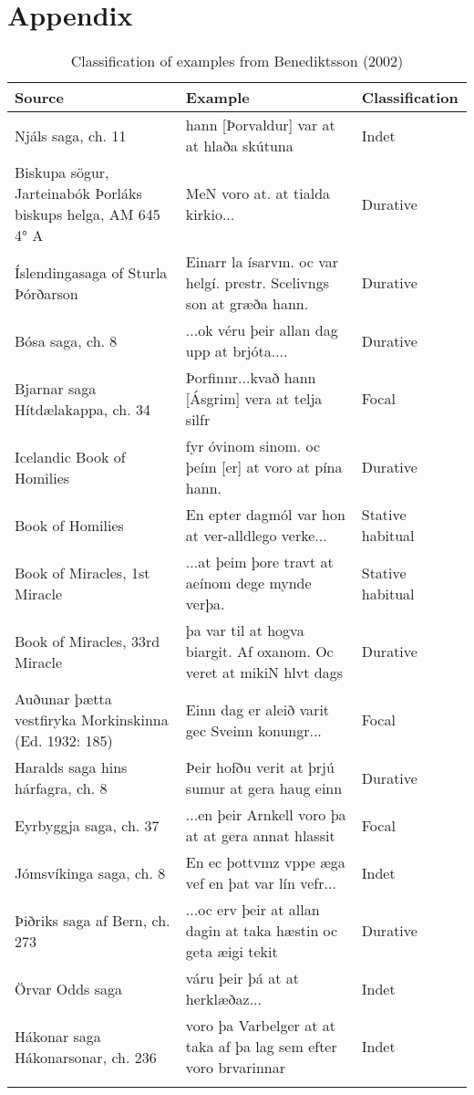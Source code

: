 \documentclass[output=paper,colorlinks,citecolor=brown]{langscibook}
\begin{document}
\sloppy\printbibliography[heading=subbibliography,notkeyword=this]

\newpage
\section*{Appendix}
\begin{paperappendix}

\begin{table}
\small
\caption{Classification of examples from Benediktsson (2002) }
\begin{tabularx}{\textwidth}{>{\raggedright\arraybackslash}p{3cm} >{\raggedright\arraybackslash}p{6cm} l}
\lsptoprule
Source & Example & Classification \\
\midrule
Njáls saga, ch. 11 & hann [Þorvaldur] var at at hlaða skútuna & Indet \\
Biskupa sögur, Jarteinabók Þorláks biskups helga, AM 645 4° A & MeN voro at. at tialda kirkio... & Durative \\
Íslendingasaga of Sturla Þórðarson & Einarr la ísarvm. oc var helgí. prestr. Scelivngs son at græða hann. & Durative \\

Bósa saga, ch. 8 & ...ok véru þeir allan dag upp at brjóta.... & Durative \\
Bjarnar saga Hítdælakappa, ch. 34 & Þorfinnr...kvað hann [Ásgrim] vera at telja silfr & Focal \\
Icelandic Book of Homilies & fyr óvinom sinom. oc þeím [er] at voro at pína hann. & Durative \\
Book of Homilies & En epter dagmól var hon at ver-alldlego verke... & Stative habitual \\
Book of Miracles, 1st Miracle & ...at þeim þore travt at aeínom dege mynde verþa. & Stative habitual \\
Book of Miracles, 33rd Miracle & þa var til at hogva biargit. Af oxanom. Oc veret at mikiN hlvt dags & Durative \\
Auðunar þætta vestfiryka Morkinskinna (Ed. 1932: 185) &  Einn dag er aleið varit gec Sveinn konungr... & Focal \\
Haralds saga hins hárfagra, ch. 8 & Þeir hofðu verit at þrjú sumur at gera haug einn & Durative \\
Eyrbyggja saga, ch. 37 & ...en þeir Arnkell voro þa at at gera annat hlassit & Focal \\
Jómsvíkinga saga, ch. 8 & En ec þottvmz vppe æga vef en þat var lín vefr... & Indet \\
Þiðriks saga af Bern, ch. 273 & ...oc erv þeir at allan dagin at taka hæstin oc geta æigi tekit & Durative \\
Örvar Odds saga & váru þeir þá at at herklæðaz... & Indet \\
Hákonar saga Hákonarsonar, ch. 236 & voro þa Varbelger at at taka af þa lag sem efter voro brvarinnar & Indet \\
\lspbottomrule
\end{tabularx}
\end{table}


\end{paperappendix}
\end{document}
